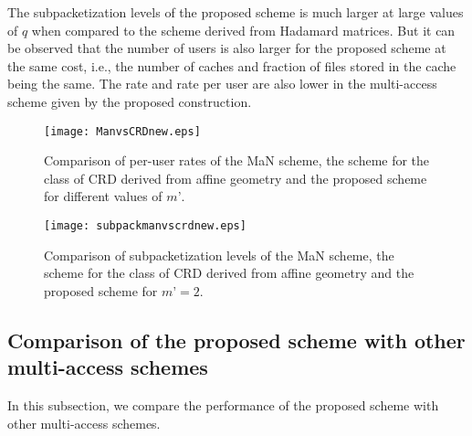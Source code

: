 \documentclass[conference]{IEEEtran}
\begin{document}
	The subpacketization levels of the proposed scheme is much larger at large values of $q$ when compared to the scheme derived from Hadamard matrices. But it can be observed that the number of users is also larger for the proposed scheme at the same cost, i.e., the number of caches and fraction of files stored in the cache being the same. The rate and rate per user are also lower in the multi-access scheme given by the proposed construction.
\begin{figure}
		\begin{center}
			\texttt{[image: ManvsCRDnew.eps]}
			\caption {Comparison of per-user rates of the MaN scheme, the scheme for the
				class of CRD derived from affine geometry and the proposed scheme for different values of $m’$.
			}
			\label{ComprateperuserMan}
		\end{center}
\end{figure}
\begin{figure}
		\begin{center}
			\texttt{[image: subpackmanvscrdnew.eps]}
			\caption {Comparison of subpacketization levels of the MaN scheme, the scheme for the class of CRD derived from affine geometry and the proposed scheme for $m’ = 2$.	
			}
			\label{CompsubpacketMan}
		\end{center}
\end{figure}
\subsection{Comparison of the proposed scheme with other multi-access schemes}
		\label{CompMultiaccess}
		In this subsection, we compare the performance of the proposed scheme with other multi-access schemes. %
\end{document}

